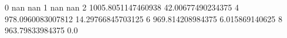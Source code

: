0 nan nan
1 nan nan
2 1005.8051147460938 42.00677490234375
4 978.0960083007812 14.29766845703125
6 969.814208984375 6.015869140625
8 963.79833984375 0.0
